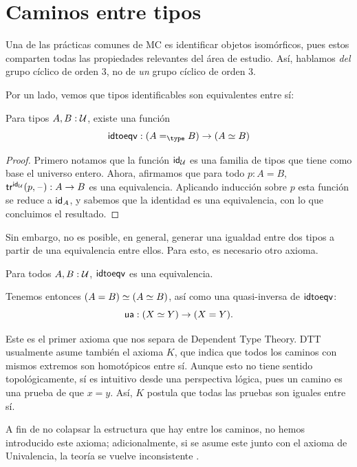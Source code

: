 \documentclass[../main.tex]{subfiles}
\begin{document}
\section{Caminos entre tipos} \label{sec-caminos}
Una de las pr\'acticas comunes de MC es identificar objetos isom\'orficos, pues estos comparten todas las propiedades relevantes del \'area de estudio.
As\'i, hablamos \textit{del} grupo c\'iclico de orden 3, no de \textit{un} grupo c\'iclico de orden 3.

Por un lado, vemos que tipos identificables son equivalentes entre s\'i:

\begin{lemma}
  Para tipos $A,B : \UU$, existe una funci\'on
  \[ \idtoeqv : (\id[\type]AB) \to (\eqv A B)\]
\end{lemma}
\begin{proof}
  Primero notamos que la funci\'on $\idfunc[\UU]$ es una familia de tipos que tiene como base el universo entero.
  Ahora, afirmamos que para todo $p:A=B$, $\trfib{\idfunc[\UU]}{p}{\blank}:A \to B$ es una equivalencia. Aplicando inducci\'on sobre $p$ esta funci\'on se reduce a $\idfunc[A]$, y sabemos que la identidad es una equivalencia, con lo que concluimos el resultado.
\end{proof}

Sin embargo, no es posible, en general, generar una igualdad entre dos tipos a partir de una equivalencia entre ellos.
Para esto, es necesario otro axioma.

\begin{axiom}[Univalencia]
  Para todos $A,B:\UU$, $\idtoeqv$ es una equivalencia.
\end{axiom}

Tenemos entonces $\eqv{(A = B)}{(\eqv{A}{B})}$, as\'i como una quasi-inversa de $\idtoeqv$:
\[
  \ua : (\eqv{X}{Y}) \to ({X=Y}).
\]

Este es el primer axioma que nos separa de Dependent Type Theory.
DTT usualmente asume tambi\'en el axioma $K$, que indica que todos los caminos con mismos extremos son homot\'opicos entre s\'i.
Aunque esto no tiene sentido topol\'ogicamente, s\'i es intuitivo desde una perspectiva l\'ogica, pues un camino es una prueba de que $x=y$.
As\'i, $K$ postula que todas las pruebas son iguales entre s\'i.

A fin de no colapsar la estructura que hay entre los caminos, no hemos introducido este axioma; adicionalmente, si se asume este junto con el axioma de Univalencia, la teor\'ia se vuelve inconsistente \cite[Lema 6.4.1.]{the_univalent_foundations_program_homotopy_2013}.
\end{document}
